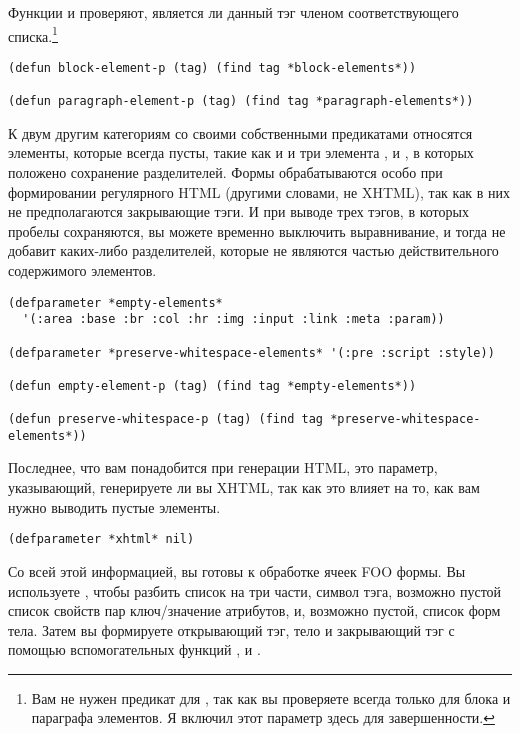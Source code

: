 Функции  и  проверяют, является ли данный
тэг членом соответствующего списка.\footnote{Вам не нужен предикат для
  , так как вы проверяете всегда только для блока и параграфа
  элементов. Я включил этот параметр здесь для завершенности.}

\begin{lstlisting}
(defun block-element-p (tag) (find tag *block-elements*))

(defun paragraph-element-p (tag) (find tag *paragraph-elements*))
\end{lstlisting}

К двум другим категориям со своими собственными предикатами относятся элементы, которые
всегда пусты, такие как  и  и три элемента ,  и
, в которых положено сохранение разделителей. Формы обрабатываются особо при
формировании регулярного HTML (другими словами, не XHTML), так как в них не предполагаются
закрывающие тэги. И при выводе трех тэгов, в которых пробелы сохраняются, вы можете
временно выключить выравнивание, и тогда  не добавит каких-либо
разделителей, которые не являются частью действительного содержимого элементов.

\begin{lstlisting}
(defparameter *empty-elements*
  '(:area :base :br :col :hr :img :input :link :meta :param))

(defparameter *preserve-whitespace-elements* '(:pre :script :style))

(defun empty-element-p (tag) (find tag *empty-elements*))

(defun preserve-whitespace-p (tag) (find tag *preserve-whitespace-elements*))
\end{lstlisting}

Последнее, что вам понадобится при генерации HTML, это параметр, указывающий, генерируете
ли вы XHTML, так как это влияет на то, как вам нужно выводить пустые элементы.

\begin{lstlisting}
(defparameter *xhtml* nil)
\end{lstlisting}

Со всей этой информацией, вы готовы к обработке ячеек FOO формы. Вы используете
, чтобы разбить список на три части, символ тэга, возможно пустой
список свойств пар ключ/значение атрибутов, и, возможно пустой, список форм тела. Затем вы
формируете открывающий тэг, тело и закрывающий тэг с помощью вспомогательных функций
,  и .


